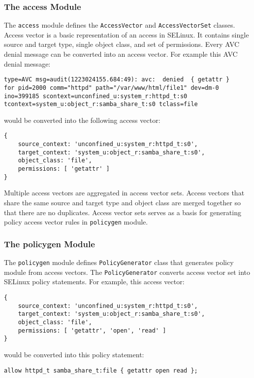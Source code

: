 \subsubsection{The access Module}

The \texttt{access} module defines the \texttt{AccessVector} and
\texttt{AccessVectorSet} classes. Access vector is a basic representation of an
access in SELinux. It contains single source and target type, single object
class, and set of permissions. Every AVC denial message can be converted into an
access vector. For example this AVC denial message:
\begin{lstlisting}
type=AVC msg=audit(1223024155.684:49): avc:  denied  { getattr }
for pid=2000 comm="httpd" path="/var/www/html/file1" dev=dm-0
ino=399185 scontext=unconfined_u:system_r:httpd_t:s0
tcontext=system_u:object_r:samba_share_t:s0 tclass=file
\end{lstlisting}
would be converted into the following access vector:
\begin{lstlisting}
{
    source_context: 'unconfined_u:system_r:httpd_t:s0',
    target_context: 'system_u:object_r:samba_share_t:s0',
    object_class: 'file',
    permissions: [ 'getattr' ]
}
\end{lstlisting}

Multiple access vectors are aggregated in access vector sets. Access vectors
that share the same source and target type and object class are merged together
so that there are no duplicates. Access vector sets serves as a basis for
generating policy access vector rules in \texttt{policygen} module.

\subsubsection{The policygen Module}

The \texttt{policygen} module defines \texttt{PolicyGenerator} class that
generates policy module from access vectors. The \texttt{PolicyGenerator}
converts access vector set into SELinux policy statements. For example, this
access vector:
\begin{lstlisting}
{
    source_context: 'unconfined_u:system_r:httpd_t:s0',
    target_context: 'system_u:object_r:samba_share_t:s0',
    object_class: 'file',
    permissions: [ 'getattr', 'open', 'read' ]
}
\end{lstlisting}
would be converted into this policy statement:
\begin{lstlisting}
allow httpd_t samba_share_t:file { getattr open read };
\end{lstlisting}

